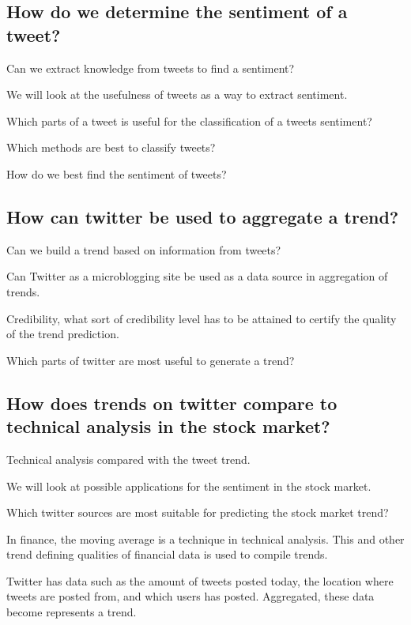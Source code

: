 \subsection{How do we determine the sentiment of a
tweet?}\label{introduction:rq1}
Can we extract knowledge from tweets to find a sentiment?
	
We will look at the usefulness of tweets as a way to extract sentiment. 

Which parts of a tweet is useful for the classification of a tweets sentiment?

Which methods are best to classify tweets? 

How do we best find the sentiment of tweets?

\subsection{How can twitter be used to aggregate a
trend?}\label{introduction:rq2}
Can we build a trend based on information from tweets? 
 
Can Twitter as a microblogging site be used as a data source in aggregation of trends.

Credibility, what sort of credibility level has to be attained to certify the
quality of the trend prediction. 

Which parts of twitter are most useful to generate a trend?

\subsection{How does trends on twitter compare to technical analysis in the
stock market?}\label{introduction:rq3}
Technical analysis compared with the tweet trend.

We will look at possible applications for the sentiment in the stock market.

Which twitter sources are most suitable for predicting the stock market
trend?

In finance, the moving average is a technique in technical analysis. This and
other trend defining qualities of financial data is used to compile trends. 

Twitter has data such as the amount of tweets posted today, the location where
tweets are posted from, and which users has posted. Aggregated, these data
become represents a trend.  

